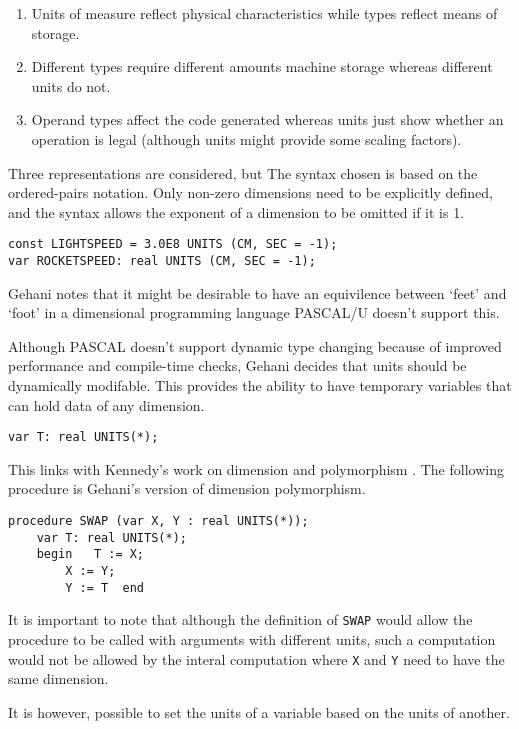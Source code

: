 \documentclass[a4paper]{article}
\begin{document}
\begin{enumerate}
\item Units of measure reflect physical characteristics while types reflect 
means of storage.
\item Different types require different amounts machine storage whereas 
different units do not.
\item Operand types affect the code generated whereas units just show whether 
an operation is legal (although units might provide some scaling factors).
\end{enumerate}

Three representations are considered, but
The syntax chosen is based on the ordered-pairs notation.
Only non-zero dimensions need to be explicitly defined, and the syntax 
allows the exponent of a dimension to be omitted if it is 1.

\begin{verbatim}
const LIGHTSPEED = 3.0E8 UNITS (CM, SEC = -1);
var ROCKETSPEED: real UNITS (CM, SEC = -1);
\end{verbatim}

Gehani notes that it might be desirable to have an equivilence between `feet' 
and `foot' in a dimensional programming language PASCAL/U doesn't support this.

Although PASCAL doesn't support dynamic type changing because of improved
performance and compile-time checks, Gehani decides that units should be
dynamically modifable. This provides the ability to have temporary
variables that can hold data of any dimension. 

\begin{verbatim}
var T: real UNITS(*);
\end{verbatim}

This links with Kennedy's work on dimension and polymorphism \cite{ME_kennedy}.
The following procedure is Gehani's version of dimension polymorphism.

\begin{verbatim}
procedure SWAP (var X, Y : real UNITS(*));
	var T: real UNITS(*);
	begin 	T := X; 
		X := Y; 
		Y := T	end
\end{verbatim}

It is important to note that although the definition of \texttt{SWAP} would
allow the procedure to be called with arguments with different units, such a 
computation would not be allowed by the interal computation where \texttt{X}
 and \texttt{Y} need to have the same dimension.

It is however, possible to set the units of a variable based on the units of 
another.
\end{document}
